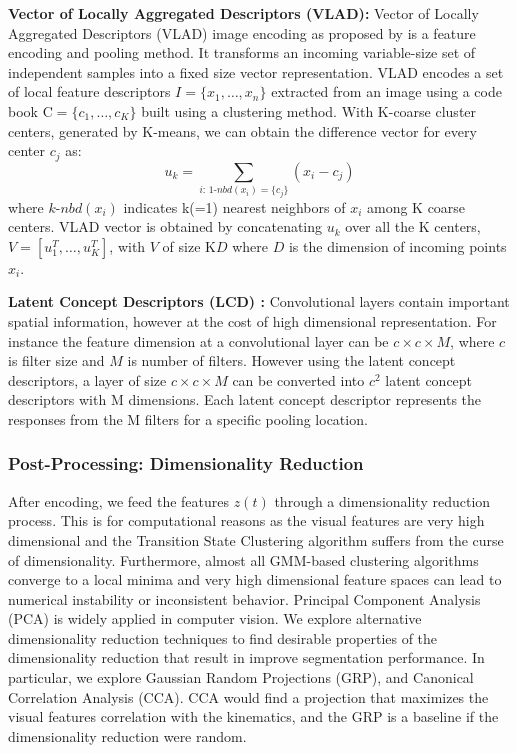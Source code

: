 \documentclass[0-main.tex]{subfiles}
\begin{document}
\vspace{0.25em}
\noindent\textbf{Vector of Locally Aggregated Descriptors (VLAD)\cite{arandjelovic2013all}: }
Vector of Locally Aggregated Descriptors (VLAD) image encoding as proposed by is a feature encoding and pooling method. 
It transforms an incoming variable-size set of independent samples into a fixed size vector representation.
VLAD encodes a set of local feature descriptors $I=\{x_1,\ldots,x_n\}$ extracted from an image using a code book $\mathrm{C} = \{c_1, \ldots, c_K \}$ built using a clustering method. With K-coarse cluster centers, generated by K-means, we can obtain the difference vector for every center $c_j$ as:\vspace{-5pt}
\[ u_k = \sum_{i:\,1\text{-}nbd(x_i)=\{c_j\}} (x_i- c_j)
\]
where $k\text{-}nbd(x_i)$ indicates k(=1) nearest neighbors of $x_i$ among K coarse centers.
VLAD vector is obtained by concatenating $u_k$ over all the K centers, $V = [u_1^T, \ldots, u_K^T]$, with $V$ of size K$D$ where $D$ is the dimension of incoming points $x_i$. 

\vspace{0.25em}
\noindent\textbf{Latent Concept Descriptors (LCD) \cite{xu2014discriminative}: }
Convolutional layers contain important spatial information, however at the cost of high dimensional representation. For instance the feature dimension at a convolutional layer can be $c\times c \times M$, where $c$ is filter size and $M$ is number of filters. However using the latent concept descriptors, a layer of size $c\times c \times M$ can be converted into $c^2$ latent concept descriptors with M dimensions. Each latent concept descriptor represents the responses from the M filters for a specific pooling location. 
\fi

\subsubsection{Post-Processing: Dimensionality Reduction}
After encoding, we feed the features $z(t)$ through a dimensionality reduction process.
This is for computational reasons as the visual features are very high dimensional and the Transition State Clustering algorithm suffers from the curse of dimensionality.
Furthermore, almost all GMM-based clustering algorithms converge to a local minima and very high dimensional feature spaces can lead to numerical instability or inconsistent behavior.
Principal Component Analysis (PCA) is widely applied in computer vision. 
We explore alternative dimensionality reduction techniques to find desirable properties of the dimensionality reduction that result in improve segmentation performance.
In particular, we explore Gaussian Random Projections (GRP), and Canonical Correlation Analysis (CCA).
CCA would find a projection that maximizes the visual features correlation with the kinematics, and the GRP is a baseline if the dimensionality reduction were random.
\end{document}
